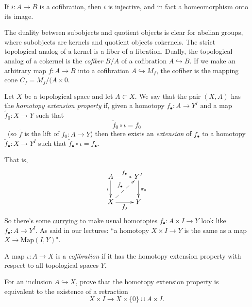 \begin{proposition}[4H.1]
\label{proposition-4h-1}
	If $i:A\to B$ is a cofibration, then $i$ is
	injective, and in fact a homeomorphism onto
	its image.
\end{proposition}

\begin{remark}
\label{remark-from-hatcher-p-461}
The duality between subobjects and quotient
objects is clear for abelian groups,
where subobjects are kernels and quotient
objects cokernels. The strict
topological analog of a kernel is a fiber of
a fibration. Dually, the
topological analog of a cokernel is the {\it
cofiber} $B/A$ of a
cofibration $A\hookrightarrow B$. If we make
an arbitrary map  $f:A\to B$ into a
cofibration $A\hookrightarrow M_{f}$, the
cofiber is the mapping cone
$C_{f}=M_{f}/(A\times {0}$.
\end{remark}

\begin{definition}
\label{definition-https-en-wikip-org-wiki}
	Let $X$ be a topological space and let
	$A\subset X$. We say that the pair $(X,A)$
	has the {\it homotopy extension property}
	if, given a homotopy $f_\bullet:A\to Y^I$
	and a map $\tilde{f}_0:X\to Y$ such that
		$$\tilde{f}_0\circ\iota=f_0$$\
		(so $\tilde{f}$ is the lift of $f_0:A\to
		Y$) then there exists an {\it extension} of
		$f_\bullet$ to a homotopy
		$\tilde{f}_\bullet:X\to Y^I$ such that
		$\tilde{f}_\bullet\circ\iota=f_\bullet$.

		That is,
		$$
		\xymatrix{
			A\ar[r]^{f_\bullet}\ar[d]_{\iota}
			&Y^I\ar[d]^{\pi_0}\\
			X\ar@{-->}[ur]^{\tilde{f}_\bullet}
			\ar[r]_{\tilde{f}_0}&Y
		}
		$$
		So there's some
		\href{https://en.wikipedia.org/wiki/%
		Currying#Function_spaces}{currying}
		to make usual homotopies $f_\bullet:A\times
		I\to Y$ look like $f_\bullet:A\to Y^I$. As
		said in our lectures: ``a homotopy $X\times
		I\to Y$ is the same as a map $X\to
		\text{Map}(I,Y)$".

	A map $\iota:A\to X$ is a {\it cofibration}
	if it has the homotopy extension property
	with respect to all topological spaces  $Y$.
\end{definition}

\begin{exercise}
For an inclusion $A\hookrightarrow X$,
prove that the homotopy extension
property is equivalent to the existence
of a retraction
$$
X\times I
\longrightarrow
X\times\{0\}\cup A\times I.
$$
\end{exercise}

